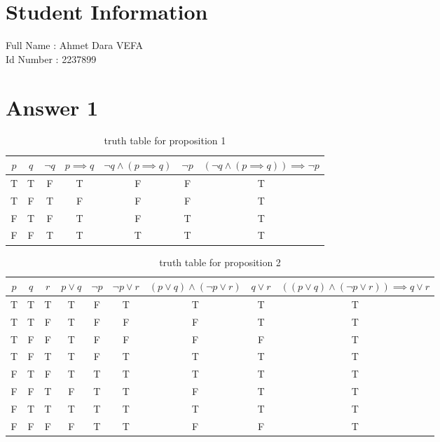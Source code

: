\documentclass[12pt]{article}
\begin{document}
\section*{Student Information } 
Full Name : Ahmet Dara VEFA \\
Id Number : 2237899 \\
\section*{Answer 1}
\begin{table}[H]
\centering
\caption{truth table for proposition 1}
\label{table:prop1.1}
\begin{tabular}{|c|c|c|c|c|c|c|}
\hline
 $p$ & $q$ & $\neg q$ & $p\implies q$ & $\neg q\land (p \implies q)$ & $\neg p$ & $ (\neg q\land(p \implies q)) \implies \neg p$\\
\hline
T & T & F & T & F & F & T\\
\hline			
T & F & T & F & F & F & T\\
\hline
F & T & F & T & F & T & T\\
\hline
F & F & T & T & T & T & T\\
\hline
\end{tabular}
\end{table}

\begin{table}[H]
\centering
\caption{truth table for proposition 2}
\label{table:prop1.2}
\begin{tabular}{|c|c|c|c|c|c|c|c|c|}
\hline
$p$ & $q$ & $r$ & $p \lor q$ & $\neg p$ & $\neg p \lor r$ & $(p \lor q) \land (\neg p \lor r) $ & $q \lor r$ & $((p \lor q) \land (\neg p \lor r)) \implies q \lor r$ \\
\hline
T & T & T & T & F & T & T & T & T\\
\hline			
T & T & F & T & F & F & F & T & T\\
\hline			
T & F & F & T & F & F & F & F & T\\
\hline
T & F & T & T & F & T & T & T & T\\			
\hline		
F & T & F & T & T & T & T & T & T\\
\hline			
F & F & T & F & T & T & F & T & T\\
\hline			
F & T & T & T & T & T & T & T & T\\
\hline			
F & F & F & F & T & T & F & F &T\\	
\hline
\end{tabular}
\end{table}
\end{document}
